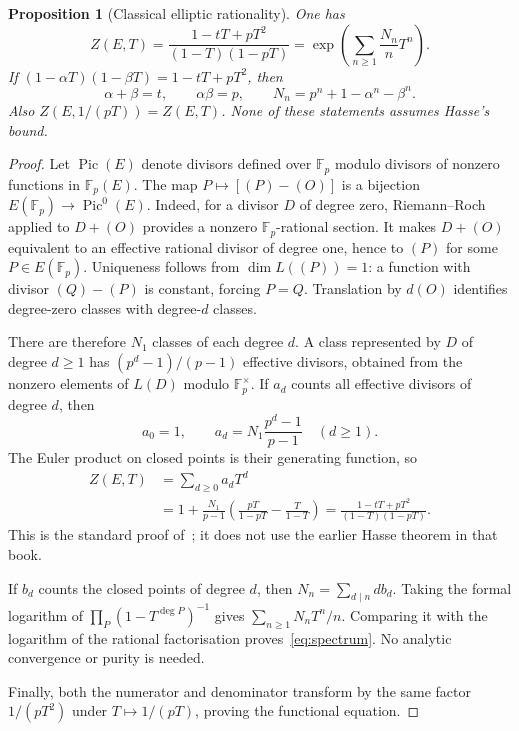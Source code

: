 \documentclass[11pt]{amsart}
\newtheorem{proposition}[theorem]{Proposition}
\theoremstyle{definition}
\theoremstyle{remark}
\newcommand{\F}{\mathbb F}
\begin{document}
\begin{proposition}[Classical elliptic rationality]\label{prop:rationality}
One has
\[
Z(E,T)=\frac{1-tT+pT^2}{(1-T)(1-pT)}
      =\exp\left(\sum_{n\ge1}\frac{N_n}{n}T^n\right).
\]
If $(1-\alpha T)(1-\beta T)=1-tT+pT^2$, then
\begin{equation}\label{eq:spectrum}
\alpha+\beta=t,\qquad\alpha\beta=p,\qquad
N_n=p^n+1-\alpha^n-\beta^n.
\end{equation}
Also $Z(E,1/(pT))=Z(E,T)$. None of these statements assumes Hasse's bound.
\end{proposition}
\begin{proof}
Let $\operatorname{Pic}(E)$ denote divisors defined over $\F_p$ modulo divisors of nonzero functions in $\F_p(E)$. The map $P\mapsto[(P)-(O)]$ is a bijection $E(\F_p)\to\operatorname{Pic}^0(E)$. Indeed, for a divisor $D$ of degree zero, Riemann--Roch applied to $D+(O)$ provides a nonzero $\F_p$-rational section. It makes $D+(O)$ equivalent to an effective rational divisor of degree one, hence to $(P)$ for some $P\in E(\F_p)$. Uniqueness follows from $\dim L((P))=1$: a function with divisor $(Q)-(P)$ is constant, forcing $P=Q$. Translation by $d(O)$ identifies degree-zero classes with degree-$d$ classes.

There are therefore $N_1$ classes of each degree $d$. A class represented by $D$ of degree $d\ge1$ has $(p^d-1)/(p-1)$ effective divisors, obtained from the nonzero elements of $L(D)$ modulo $\F_p^\times$. If $a_d$ counts all effective divisors of degree $d$, then
\[
a_0=1,\qquad a_d=N_1\frac{p^d-1}{p-1}\quad(d\ge1).
\]
The Euler product on closed points is their generating function, so
\[
\begin{aligned}
Z(E,T)
 &=\sum_{d\ge0}a_dT^d\\
 &=1+\frac{N_1}{p-1}
       \left(\frac{pT}{1-pT}-\frac{T}{1-T}\right)
 =\frac{1-tT+pT^2}{(1-T)(1-pT)}.
\end{aligned}
\]
This is the standard proof of~\cite[IV, Prop.~9.9 and Thm.~9.10,
pp.~155--156]{Mil20}; it does not use the earlier Hasse theorem in that book.

If $b_d$ counts the closed points of degree $d$, then $N_n=\sum_{d\mid n}d b_d$. Taking the formal logarithm of $\prod_P(1-T^{\deg P})^{-1}$ gives $\sum_{n\ge1}N_nT^n/n$. Comparing it with the logarithm of the rational factorisation proves~\eqref{eq:spectrum}. No analytic convergence or purity is needed.

Finally, both the numerator and denominator transform by the same factor $1/(pT^2)$ under $T\mapsto1/(pT)$, proving the functional equation.
\end{proof}
\end{document}

